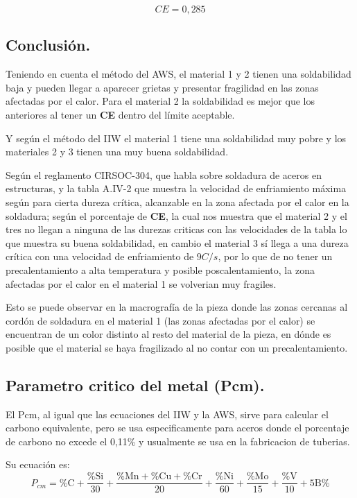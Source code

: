 \documentclass[12pt,a4paper]{article}
\begin{document}
\begin{equation*}
    CE = 0,285
\end{equation*}

\subsection{Conclusión.}

Teniendo en cuenta el método del AWS, el material 1 y 2 tienen una soldabilidad baja y pueden llegar a aparecer grietas y presentar fragilidad en las zonas afectadas por el calor. Para el material 2 la soldabilidad es mejor que los anteriores al tener un \textbf{CE} dentro del límite aceptable.

Y según el método del IIW el material 1 tiene una soldabilidad muy pobre y los materiales 2 y 3 tienen una muy buena soldabilidad.

Según el reglamento CIRSOC-304, que habla sobre soldadura de aceros en estructuras, y la tabla A.IV-2 que muestra la velocidad de enfriamiento máxima según para cierta dureza crítica, alcanzable en la zona afectada por el calor en la soldadura; según el porcentaje de \textbf{CE}, la cual nos muestra que el material 2 y el tres no llegan a ninguna de las durezas criticas con las velocidades de la tabla lo que muestra su buena soldabilidad, en cambio el material 3 sí llega a una dureza crítica con una velocidad de enfriamiento de $9C/s$, por lo que de no tener un precalentamiento a alta temperatura y posible poscalentamiento, la zona afectadas por el calor en el material 1 se volverian muy fragiles.

Esto se puede observar en la macrografía de la pieza donde las zonas cercanas al cordón de soldadura en el material 1 (las zonas afectadas por el calor) se encuentran de un color distinto al resto del material de la pieza, en dónde es posible que el material se haya fragilizado al no contar con un precalentamiento.

\subsection{Parametro critico del metal (Pcm).}

El Pcm, al igual que las ecuaciones del IIW y la AWS, sirve para calcular el carbono equivalente, pero se usa especificamente para aceros donde el porcentaje de carbono no excede el 0,11\% y usualmente se usa en la fabricacion de tuberias.

Su ecuación es:
\begin{equation}
    P_{cm} = \text{\%C} + \frac{\text{\%Si}}{30} + \frac{\text{\%Mn}+\text{\%Cu}+\text{\%Cr}}{20} + \frac{\text{\%Ni}}{60} + \frac{\text{\%Mo}}{15} + \frac{\text{\%V}}{10} + \text{5B\%}
\end{equation}
\end{document}
